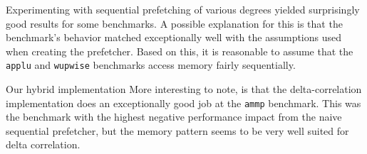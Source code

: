 
Experimenting with sequential prefetching of various degrees yielded surprisingly good results for some benchmarks.
A possible explanation for this is that the benchmark's behavior matched exceptionally well with the assumptions used when creating the prefetcher.
Based on this, it is reasonable to assume that the \texttt{applu} and \texttt{wupwise} benchmarks access memory fairly sequentially.


Our hybrid implementation 
More interesting to note, is that the delta-correlation implementation does an exceptionally good job at the \texttt{ammp} benchmark.
This was the benchmark with the highest negative performance impact from the naive sequential prefetcher, but the memory pattern seems to be very well suited for delta correlation.
